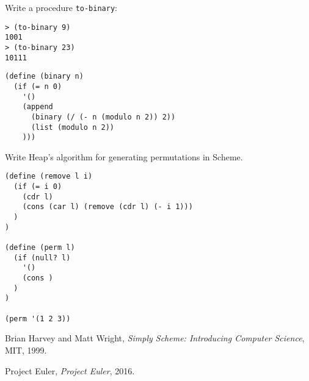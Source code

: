 \begin{questions}
\begin{solution}
\begin{verbatim}
  \end{verbatim}
\end{solution}

\question
Write a procedure \texttt{to-binary}:
\begin{verbatim}
> (to-binary 9)
1001
> (to-binary 23)
10111
\end{verbatim}

\begin{solution}
  \begin{verbatim}
(define (binary n)
  (if (= n 0)
    '()
    (append
      (binary (/ (- n (modulo n 2)) 2))
      (list (modulo n 2))
    )))
  \end{verbatim}
\end{solution}

\question
Write Heap's algorithm for generating permutations in Scheme.

\begin{solution}
  \begin{verbatim}
(define (remove l i)
  (if (= i 0)
    (cdr l)
    (cons (car l) (remove (cdr l) (- i 1)))
  )
)

(define (perm l)
  (if (null? l)
    '()
    (cons )
  )
)

(perm '(1 2 3))
  \end{verbatim}
\end{solution}

\end{questions}

\begin{thebibliography}{12}
  
  Brian Harvey and Matt Wright,
  \emph{Simply Scheme: Introducing Computer Science},
  MIT,
  1999.
  
  Project Euler,
  \emph{Project Euler},
  2016.

\end{thebibliography}
